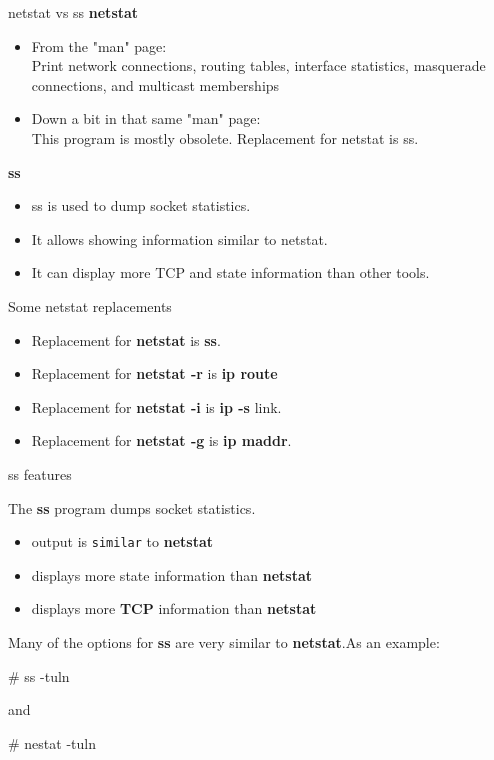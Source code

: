 \cprotect\note{

}

\begin{frame}
   {netstat vs ss}
	\textbf{netstat} 
	\begin{itemize} 
		\item From the "man" page: \\
			Print network connections, 
			routing tables, interface statistics, 
			masquerade connections, and multicast memberships
		\item Down a bit in that same "man" page: \\
			This program is mostly obsolete.  
			Replacement for netstat is ss.  
	\end{itemize}
	\textbf{ss}
	\begin{itemize}
		\item
 	ss  is used to dump socket statistics. 
		\item
	It allows showing information similar to netstat.
		\item
	It can display more TCP and state information than other tools.
	\end{itemize}

	

\end{frame}

\cprotect\note{

}

\begin{frame}
	{Some netstat replacements}
	\begin{itemize}
	\item Replacement for \textbf{netstat} is \textbf{ss}.  
	\item Replacement for \textbf{netstat -r} is  \textbf{ip route} 
	\item Replacement for \textbf{netstat -i} is \textbf{ip -s} link.
	\item Replacement for \textbf{netstat -g} is \textbf{ip maddr}.

	\end{itemize} 

\end{frame}

\cprotect\note{
}


\begin{frame}
	{ss features} 
	
	The \textbf{ss} program dumps socket statistics. 
	\begin{itemize} 
	\item output is \texttt{similar} to \textbf{netstat}
	\item displays more state information than \textbf{netstat}
	\item displays more \textbf{TCP} information than \textbf{netstat}
	\end{itemize} 

	Many of the options for \textbf{ss} are very 
	similar to \textbf{netstat}.As an example:
	\begin{raw} 
# ss -tuln 
	\end{raw} 
	and
	\begin{raw} 
# nestat -tuln 
	\end{raw} 
	

\end{frame}

